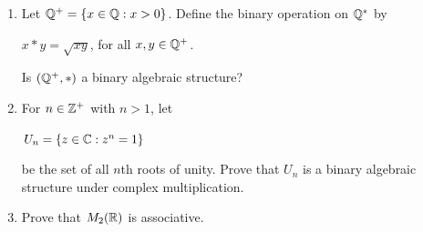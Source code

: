 \documentclass[11pt,fleqn,dvipsnames,usenames]{article}
\renewcommand{\headrulewidth}{1pt}
\begin{document}
\fancyhead[L]{\course}
\fancyhead[R]{\term}
\renewcommand{\headrulewidth}{0.4pt}

\begin{enumerate}[1.]
\item Let $\mathbb{Q}^{+} = \left\{x\in\mathbb{Q}:x > 0\right\}$.  Define the binary operation on $\mathbb{Q}^{*}$ by
\begin{center}
$x*y = \sqrt{xy}$, for all $x,y\in\mathbb{Q}^{+}$.
\end{center}
Is $(\mathbb{Q}^{+},*)$ a binary algebraic structure?
\item For $n\in\mathbb{Z}^{+}$ with $n > 1$, let
\begin{center}
$U_{n} = \left\{z\in\mathbb{C}:z^n = 1\right\}$
\end{center}
be the set of all $n$th roots of unity.  Prove that $U_{n}$ is a binary algebraic structure under complex multiplication.
\item Prove that $M_{2}(\mathbb{R})$ is associative.

\end{enumerate}
\end{document}
